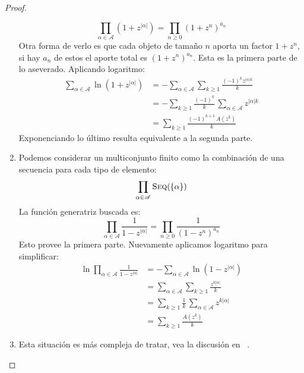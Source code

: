 \begin{proof}
\begin{enumerate}
      \begin{equation*}
        \prod_{\alpha \in \mathscr{A}}
            \left( 1 + z^{\lvert \alpha \rvert} \right)
          = \prod_{n \ge 0} (1 + z^n)^{a_n}
      \end{equation*}
      Otra forma de verlo es que cada objeto de tamaño \(n\)
      aporta un factor \(1 + z^n\),
      si hay \(a_n\) de estos
      el aporte total es \((1 + z^n)^{a_n}\).
      Esta es la primera parte de lo aseverado.
      Aplicando logaritmo:
      \begin{align*}
        \sum_{\alpha \in \mathscr{A}}
            \ln \left(1 + z^{\lvert \alpha \rvert} \right)
          &= -\sum_{\alpha \in \mathscr{A}}
                \sum_{k \ge 1}
                  \frac{(-1)^k z^{\lvert \alpha \rvert k}}{k}  \\
          &= -\sum_{k \ge 1} \frac{(-1)^k}{k} \,
                \sum_{\alpha \in \mathscr{A}}
                  z^{\lvert \alpha \rvert k} \\
          &= \sum_{k \ge 1} \frac{(-1)^{k + 1} \, A(z^k)}{k}
      \end{align*}
      Exponenciando lo último
      resulta equivalente a la segunda parte.
    \item %
      Podemos considerar un multiconjunto finito
      como la combinación de una secuencia
      para cada tipo de elemento:
      \begin{equation*}
        \prod_{\alpha \in \mathscr{A}} \operatorname{\textsc{Seq}}(\{ \alpha \})
      \end{equation*}
      La función generatriz buscada es:
      \begin{equation*}
        \prod_{\alpha \in \mathscr{A}}
          \frac{1}{1 - z^{\lvert \alpha \rvert}}
          = \prod_{n \ge 0} \frac{1}{(1 - z^n)^{a_n}}
      \end{equation*}
      Esto provee la primera parte.
      Nuevamente aplicamos logaritmo para simplificar:
      \begin{align*}
        \ln \prod_{\alpha \in \mathscr{A}}
               \frac{1}{1 - z^{\lvert \alpha \rvert}}
          &= - \sum_{\alpha \in \mathscr{A}}
                 \ln \left( 1 - z^{\lvert \alpha \rvert} \right) \\
          &= \sum_{\alpha \in \mathscr{A}}
               \sum_{k \ge 1}
                 \frac{z^{k \lvert \alpha \rvert}}{k} \\
          &= \sum_{k \ge 1}
               \frac{1}{k} \,
                 \sum_{\alpha \in \mathscr{A}}
                   z^{k \lvert \alpha \rvert} \\
          &= \sum_{k \ge 1}
               \frac{A(z^k)}{k}
      \end{align*}
    \item %
      Esta situación es más compleja de tratar,
      vea la discusión en~%
        \cite[sección~21.2.3]{brand17:_fundamentos_informatica}.
      \qedhere
    \end{enumerate}
  \end{proof}

